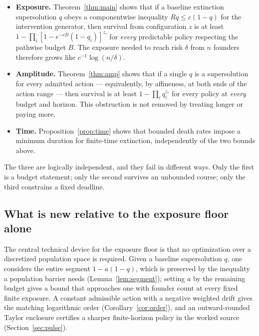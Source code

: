 \begin{itemize}
\item \textbf{Exposure.} Theorem~\ref{thm:main} shows that if a baseline
extinction supersolution $q$ obeys a componentwise inequality $Rq\le c(1-q)$
for the intervention generator, then survival from configuration $z$ is at
least $1-\prod_i[1-e^{-cB}(1-q_i)]^{z_i}$ for \emph{every} predictable policy
respecting the pathwise budget $B$. The exposure needed to reach risk $\delta$
from $n$ founders therefore grows like $c^{-1}\log(n/\delta)$.
\item \textbf{Amplitude.} Theorem~\ref{thm:amp} shows that if a single $q$ is a
supersolution for every admitted action --- equivalently, by affineness, at
both ends of the action range --- then survival is at least $1-\prod_iq_i^{z_i}$
for every policy at \emph{every} budget and horizon. This obstruction is not
removed by treating longer or paying more.
\item \textbf{Time.} Proposition~\ref{prop:time} shows that bounded death rates
impose a minimum duration for finite-time extinction, independently of the two
bounds above.
\end{itemize}

The three are logically independent, and they fail in different ways. Only the
first is a budget statement; only the second survives an unbounded course; only
the third constrains a fixed deadline.

\subsection*{What is new relative to the exposure floor alone}

The central technical device for the exposure floor is that no optimization over
a discretized population space is required. Given a baseline supersolution $q$,
one considers the entire segment $1-a(1-q)$, which is preserved by the
inequality a population barrier needs (Lemma~\ref{lem:segment}); setting $a$ by
the remaining budget gives a bound that approaches one with founder count at
every fixed finite exposure. A constant admissible action with a negative
weighted drift gives the matching logarithmic order
(Corollary~\ref{cor:order}), and an outward-rounded Taylor enclosure certifies a
sharper finite-horizon policy in the worked source
(Section~\ref{sec:pulse}).

